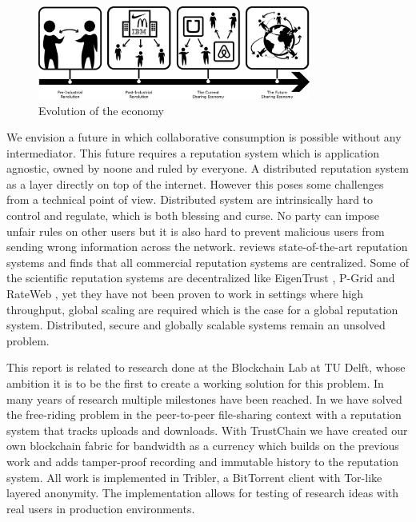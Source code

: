 \begin{figure}
    \centering
    \includegraphics[width=0.8\textwidth]{images/economy.png}
    \caption{Evolution of the economy}
    \label{fig:economy}
\end{figure}

We envision a future in which collaborative consumption is possible without any intermediator. This
future requires a reputation system which is application agnostic, owned by noone and ruled by 
everyone. A distributed reputation system as a layer directly
on top of the internet. However this poses some challenges from a technical
point of view. Distributed system are intrinsically hard to control and regulate, which is both 
blessing and curse. No party can impose unfair rules on other users but it is also hard to prevent 
malicious users from sending wrong information across the network. \cite{HENDRIKX2015184} reviews
state-of-the-art reputation systems and finds that all commercial reputation systems are centralized.
Some of the scientific reputation systems are decentralized like EigenTrust 
\cite{kamvar2003eigentrust}, P-Grid \cite{aberer2003p} and RateWeb \cite{malik2009rateweb}, yet
they have not been proven to work in settings where high throughput, global scaling are required 
which is the case for a global reputation system. Distributed, secure and globally scalable systems
remain an unsolved problem.


This report is related to research done at the Blockchain Lab at TU Delft, whose ambition it is to 
be the first to create a working solution for this problem. In many years of research multiple 
milestones have been reached. In \cite{meulpolder2009bartercast} we have solved the free-riding 
problem in the peer-to-peer file-sharing context with a reputation system that tracks uploads and 
downloads. With TrustChain \cite{OTTE2017} we have created our own blockchain fabric for bandwidth
as a currency which builds on the previous work and adds tamper-proof recording and immutable history
to the reputation system. All work is implemented in Tribler, a BitTorrent client with Tor-like 
layered anonymity. The implementation allows for testing of research ideas with real users in 
production environments. 

